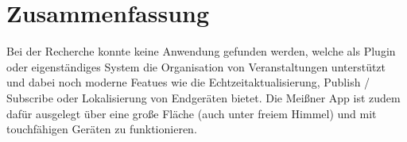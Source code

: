 
\section{Zusammenfassung}
Bei der Recherche konnte keine Anwendung gefunden werden, welche als Plugin oder eigenständiges System die Organisation von Veranstaltungen unterstützt und dabei noch moderne Featues wie die Echtzeitaktualisierung, Publish / Subscribe oder Lokalisierung von Endgeräten bietet. Die Meißner App ist zudem dafür ausgelegt über eine große Fläche (auch unter freiem Himmel) und mit touchfähigen Geräten zu funktionieren. 